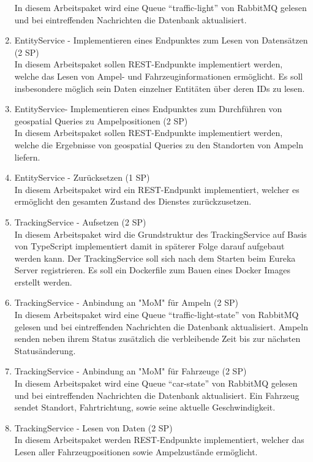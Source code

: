 \begin{enumerate}
  		In diesem Arbeitspaket wird eine Queue \enquote{traffic-light} von RabbitMQ gelesen und bei eintreffenden Nachrichten die Datenbank aktualisiert.
  \item EntityService - Implementieren eines Endpunktes zum Lesen von Datensätzen (2 SP)\\
  		In diesem Arbeitspaket sollen REST-Endpunkte implementiert werden, welche das Lesen von Ampel- und Fahrzeuginformationen ermöglicht.
  		Es soll insbesondere möglich sein Daten einzelner Entitäten über deren IDs zu lesen.
  \item EntityService- Implementieren eines Endpunktes zum Durchführen von geospatial Queries zu Ampelpositionen (2 SP)\\
  		In diesem Arbeitspaket sollen REST-Endpunkte implementiert werden, welche die Ergebnisse von geospatial Queries zu den Standorten von Ampeln liefern.
  \item EntityService - Zurücksetzen (1 SP)\\
 		In diesem Arbeitspaket wird ein REST-Endpunkt implementiert, welcher es ermöglicht den gesamten Zustand des Dienstes zurückzusetzen.
  \item TrackingService - Aufsetzen (2 SP)\\
  		In diesem Arbeitspaket wird die Grundstruktur des TrackingService auf Basis von TypeScript implementiert damit in späterer Folge darauf aufgebaut werden kann.
  		Der TrackingService soll sich nach dem Starten beim Eureka Server registrieren.
  		Es soll ein Dockerfile zum Bauen eines Docker Images erstellt werden.
  \item TrackingService - Anbindung an "MoM" für Ampeln (2 SP)\\
  		In diesem Arbeitspaket wird eine Queue \enquote{traffic-light-state} von RabbitMQ gelesen und bei eintreffenden Nachrichten die Datenbank aktualisiert.
  		Ampeln senden neben ihrem Status zusätzlich die verbleibende Zeit bis zur nächsten Statusänderung.
  \item TrackingService - Anbindung an "MoM" für Fahrzeuge (2 SP)\\
  		In diesem Arbeitspaket wird eine Queue \enquote{car-state} von RabbitMQ gelesen und bei eintreffenden Nachrichten die Datenbank aktualisiert.
  		Ein Fahrzeug sendet Standort, Fahrtrichtung, sowie seine aktuelle Geschwindigkeit.
  \item TrackingService - Lesen von Daten (2 SP)\\
  		In diesem Arbeitspaket werden REST-Endpunkte implementiert, welcher das Lesen aller Fahrzeugpositionen sowie Ampelzustände ermöglicht.

\end{enumerate}
